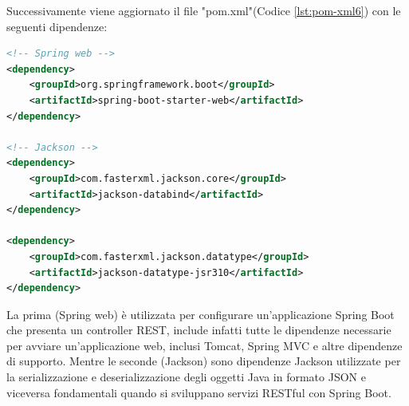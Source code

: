 Successivamente viene aggiornato il file "pom.xml"(Codice \vref{lst:pom-xml6}) con le seguenti dipendenze:
\begin{lstlisting}[language=XML, caption={Aggiornamento dipendenze nel pom.xml per includere spring-web}, label=lst:pom-xml6]
<!-- Spring web -->
<dependency>
    <groupId>org.springframework.boot</groupId>
    <artifactId>spring-boot-starter-web</artifactId>
</dependency>

<!-- Jackson -->
<dependency>
    <groupId>com.fasterxml.jackson.core</groupId>
    <artifactId>jackson-databind</artifactId>
</dependency>

<dependency>
    <groupId>com.fasterxml.jackson.datatype</groupId>
    <artifactId>jackson-datatype-jsr310</artifactId>
</dependency>
\end{lstlisting}
La prima (Spring web) è utilizzata per configurare un'applicazione Spring Boot che presenta un controller REST, include infatti tutte le dipendenze necessarie per avviare un'applicazione web, inclusi Tomcat, Spring MVC e altre dipendenze di supporto.
Mentre le seconde (Jackson) sono dipendenze Jackson utilizzate per la serializzazione e deserializzazione degli oggetti Java in formato JSON e viceversa fondamentali quando si sviluppano servizi RESTful con Spring Boot.
